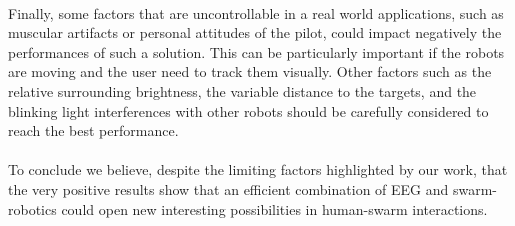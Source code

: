 \documentclass[smallextended]{svjour3}
\begin{document}
\\
Finally, some factors that are uncontrollable in a real world applications, such as muscular artifacts or personal attitudes of the pilot, could impact negatively the performances of such a solution. This can be particularly important if the robots are moving and the user need to track them visually. 
Other factors such as the relative surrounding brightness, the variable distance to the targets, and the blinking light interferences with other robots should be carefully considered to reach the best performance. \\
\\
To conclude we believe, despite the limiting factors highlighted by our work, that the very positive results show that an efficient combination of EEG and swarm-robotics could open new interesting possibilities in human-swarm interactions.\\

\iffalse
\end{document}
